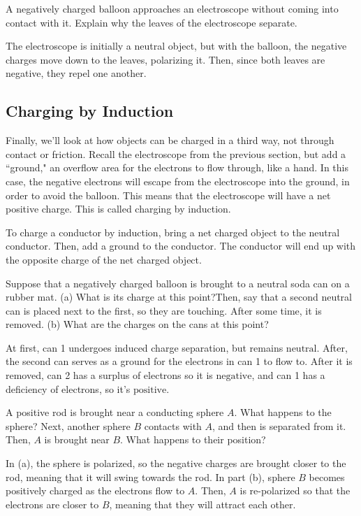 \documentclass[11pt]{article}
\begin{document}
\begin{example}
	A negatively charged balloon approaches an electroscope without coming into contact with it. Explain why the leaves of the electroscope separate.	
\end{example}
\begin{solution}
	The electroscope is initially a neutral object, but with the balloon, the negative charges move down to the leaves, polarizing it. Then, since both leaves are negative, they repel one another.
\end{solution}

\subsection{Charging by Induction}
Finally, we'll look at how objects can be charged in a third way, not through contact or friction. Recall the electroscope from the previous section, but add a ``ground," an overflow area for the electrons to flow through, like a hand. In this case, the negative electrons will escape from the electroscope into the ground, in order to avoid the balloon. This means that the electroscope will have a net positive charge. This is called charging by induction.
\begin{defn}[Induction]
	To charge a conductor by induction, bring a net charged object to the neutral conductor. Then, add a ground to the conductor. The conductor will end up with the opposite charge of the net charged object.
\end{defn}
\begin{example}
	Suppose that a negatively charged balloon is brought to a neutral soda can on a rubber mat. (a) What is its charge at this point?Then, say that a second neutral can is placed next to the first, so they are touching. After some time, it is removed. (b) What are the charges on the cans at this point?
\end{example}
\begin{solution}
	At first, can 1 undergoes induced charge separation, but remains $\boxed{\text{neutral}}$. After, the second can serves as a ground for the electrons in can 1 to flow to. After it is removed, can 2 has a surplus of electrons so it is $\boxed{\text{negative}}$, and can 1 has a deficiency of electrons, so it's $\boxed{\text{positive}}$.
\end{solution}

\begin{question}
	A positive rod is brought near a conducting sphere $A$. What happens to the sphere? Next, another sphere $B$ contacts with $A$, and then is separated from it. Then, $A$ is brought near $B$. What happens to their position?
\end{question}
\begin{solution}
	In (a), the sphere is polarized, so the negative charges are brought closer to the rod, meaning that it will swing towards the rod. In part (b), sphere $B$ becomes positively charged as the electrons flow to $A$. Then, $A$ is re-polarized so that the electrons are closer to $B$, meaning that they will attract each other.
\end{solution}
\end{document}
